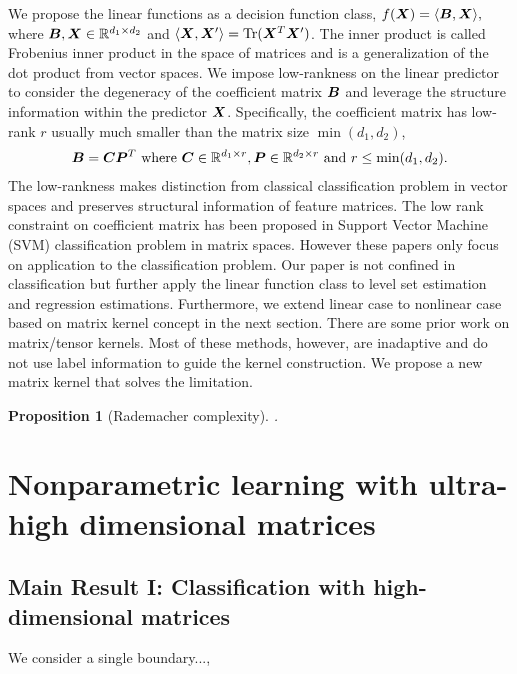 \documentclass[mathptm]{statsoc}
\newtheorem{prop}{Proposition}
\begin{document}
We propose the linear functions as a decision function class, $f(\bm X) = \langle \bm B,\bm X\rangle,$
where $\bm B,\bm X\in\mathbb{R}^{d_1\times d_2}$ and $\langle \bm X,\bm X'\rangle = \text{Tr}(\bm X^T\bm X')$. The inner product is called Frobenius inner product in the space of matrices and is a generalization of the dot product from vector spaces.
We impose low-rankness on the linear predictor to consider the degeneracy of the coefficient matrix $\bm B$ and leverage the structure information within the predictor $\bm X$.
Specifically,  the coefficient matrix has low-rank $r$  usually much smaller than the matrix size  $\min(d_1,d_2)$,
\begin{align}\label{eq:lowrank}
\bm B = \bm C\bm{P}^T \text{ where } \bm C \in\mathbb{R}^{d_1\times r} ,\bm{P}\in\mathbb{R}^{d_2\times r}\text{ and } r\leq\min(d_1,d_2).
\end{align}
The low-rankness makes distinction from classical classification problem in vector spaces and preserves structural information of feature matrices. The low rank constraint on coefficient matrix has been proposed in Support Vector Machine (SVM) classification problem \citep{pirsiavash2009bilinear,luo2015support} in matrix spaces. However these papers only focus on application to the classification problem. Our paper is not confined in classification but further apply the linear function class to level set estimation and regression estimations. Furthermore, we extend linear case to nonlinear case based on matrix kernel concept in the next section. There are some prior work on matrix/tensor kernels. Most of these methods, however, are inadaptive and do not use label information to guide the kernel construction. We propose a new matrix kernel that solves the limitation.

\begin{prop}[Rademacher complexity]. 

\end{prop}


\section{Nonparametric learning with ultra-high dimensional matrices}


\subsection{Main Result I: Classification with high-dimensional matrices} 
We consider a single boundary..., 
 
\end{document}
